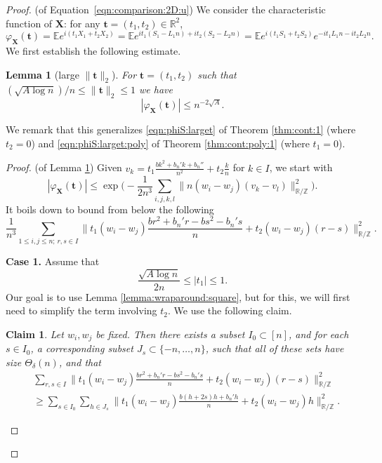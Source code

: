 \documentclass[reqno]{amsart}
\newcommand\R{{\mathbb{R}}}
\newcommand\Z{{\mathbb{Z}}}
\newcommand\E{{\mathbb{E}}}
\newcommand\BMt{{\bm t}}
\newcommand\BMX{{\bm X}}
\theoremstyle{plain}
\newtheorem{lemma}[theorem]{Lemma}
\newtheorem{claim}[theorem]{Claim}
\theoremstyle{definition}
\begin{document}
\begin{proof}(of Equation~\eqref{eqn:comparison:2D:u}) 
We consider the characteristic function of $\BMX$: for any $\BMt=(t_{1},t_{2}) \in \R^{2}$,
\[
\varphi_{\BMX}(\BMt) = \E e^{i (t_{1}X_{1} + t_{2}X_{2})} 
= \E e^{i t_{1}(S_{1} - L_{1}n) + i t_{2} (S_{2} - L_{2}n)} = \E e^{i (t_{1}S_{1} + t_{2} S_{2})} e^{{-it_{1} L_{1}n - i t_{2}L_{2}n}}.
\]
We first establish the following estimate.
\begin{lemma}[large $\|\BMt\|_{2}$]\label{lemma:quad:1}
For $\BMt=(t_{1},t_{2})$ such that $(\sqrt{A\log n})/n \le \|\BMt\|_{2} \le 1$ we have
\[
|\varphi_{\BMX}(\BMt)| \le n^{-2\sqrt{A}}.
\]
\end{lemma}

We remark that this generalizes \eqref{eqn:phiS:larget} of Theorem \ref{thm:cont:1} (where $t_{2}=0$) and \eqref{eqn:phiS:larget:poly} of Theorem \ref{thm:cont:poly:1} (where $t_{1}=0$).
 
\begin{proof}(of Lemma \ref{lemma:quad:1}) Given $v_{k} = t_{1}\frac{b k^2 + b_{n}' k + b_{n}''}{n^{2}} + t_{2}  \frac{k}{n}$ for $k\in I$, we start with
\[
|\varphi_{\BMX}(\BMt)|  \le \exp\Big(- \frac{1}{2n^{3}} \sum_{i,j,k,l} \|n (w_{i}-w_{j}) (v_{k}-v_{l})\|_{\R/\Z}^{2}\Big).
\]
It boils down to bound from below the following
\[
\frac{1}{n^{3}} \sum_{1\le i,j\le n; \, r,s \in I} \big\| t_{1} (w_{i}-w_{j})\frac{b r^2 + b_{n}' r-b s^2 - b_{n}' s}{n} + t_{2}(w_{i}-w_{j}) (r - s) \big\|_{\R/\Z}^{2}.
\]


\medskip
\noindent\textbf{Case 1.}
Assume that
\[
\frac{\sqrt{A\log n}}{2n} \le |t_{1}| \le 1.
\]
Our goal is to use Lemma \ref{lemma:wraparound:square}, but for this, we will first need to simplify the term involving $t_{2}$. We use the following claim. 

\begin{claim} Let $w_{i}, w_{j}$ be fixed. Then there exists a subset $I_{0} \subset [n]$, and for each $s\in I_{0}$, a corresponding subset $J_{s} \subset \{-n,\dots,n\}$, such that all of these sets have size $\Theta_{\delta}(n)$, and that
\begin{align*}
& \sum_{r,s \in I} \big\| t_{1} (w_{i}-w_{j})\frac{b r^2 + b_{n}' r-b s^2 - b_{n}' s}{n} + t_{2}(w_{i}-w_{j}) (r - s) \big\|_{\R/\Z}^{2} \\
& \ge \sum_{s\in I_{0}} \sum_{h\in J_{s}} \big\| t_{1} (w_{i}-w_{j})\frac{b (h+2s)h + b_{n}'h}{n} + t_{2}(w_{i}-w_{j})h \big\|_{\R/\Z}^{2}.
\end{align*}
\end{claim}


\end{proof}
\end{proof}
\end{document}
